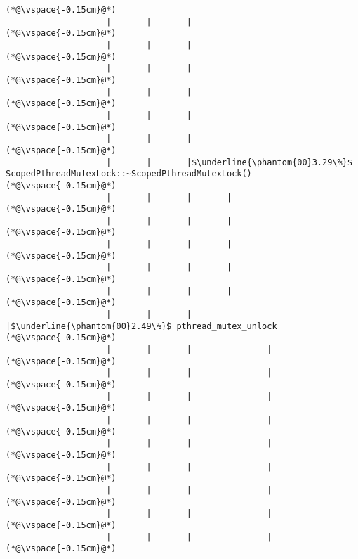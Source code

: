 \begin{lstlisting}[caption=Metodikutsu C$\to$Java 20 int-parametrilla, label=profile:C2JBenchmark00146, numberbychapter=true, frame=lines, float, floatplacement=t]
(*@\vspace{-0.15cm}@*)
                    |       |       |
(*@\vspace{-0.15cm}@*)
                    |       |       |
(*@\vspace{-0.15cm}@*)
                    |       |       |
(*@\vspace{-0.15cm}@*)
                    |       |       |
(*@\vspace{-0.15cm}@*)
                    |       |       |
(*@\vspace{-0.15cm}@*)
                    |       |       |
(*@\vspace{-0.15cm}@*)
                    |       |       |$\underline{\phantom{00}3.29\%}$ ScopedPthreadMutexLock::~ScopedPthreadMutexLock()
(*@\vspace{-0.15cm}@*)
                    |       |       |       |
(*@\vspace{-0.15cm}@*)
                    |       |       |       |
(*@\vspace{-0.15cm}@*)
                    |       |       |       |
(*@\vspace{-0.15cm}@*)
                    |       |       |       |
(*@\vspace{-0.15cm}@*)
                    |       |       |       |
(*@\vspace{-0.15cm}@*)
                    |       |       |       |$\underline{\phantom{00}2.49\%}$ pthread_mutex_unlock
(*@\vspace{-0.15cm}@*)
                    |       |       |               |
(*@\vspace{-0.15cm}@*)
                    |       |       |               |
(*@\vspace{-0.15cm}@*)
                    |       |       |               |
(*@\vspace{-0.15cm}@*)
                    |       |       |               |
(*@\vspace{-0.15cm}@*)
                    |       |       |               |
(*@\vspace{-0.15cm}@*)
                    |       |       |               |
(*@\vspace{-0.15cm}@*)
                    |       |       |               |
(*@\vspace{-0.15cm}@*)
                    |       |       |               |
(*@\vspace{-0.15cm}@*)
                    |       |       |               |
(*@\vspace{-0.15cm}@*)

\end{lstlisting}
